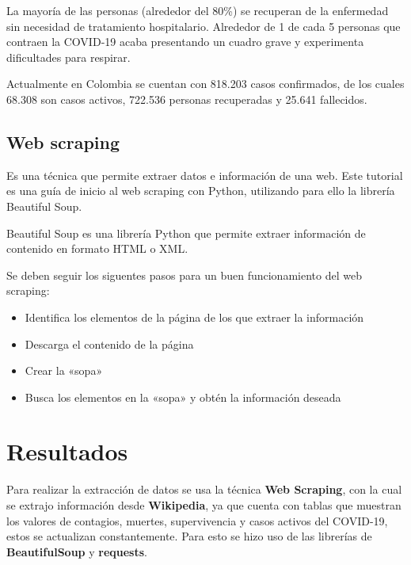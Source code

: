 \documentclass[conference,compsoc,onecolumn]{IEEEtran}
\begin{document}
La mayoría de las personas (alrededor del 80\%) se recuperan de la enfermedad sin necesidad de tratamiento hospitalario.  Alrededor de 1 de cada 5 personas que contraen la COVID‑19 acaba presentando un cuadro grave y experimenta dificultades para respirar.

Actualmente en Colombia se cuentan con 818.203 casos confirmados, de los cuales 68.308 son casos activos, 722.536 personas recuperadas y 25.641 fallecidos.
\hfill \break
\subsection{Web scraping} 
Es una técnica que permite extraer datos e información de una web. Este tutorial es una guía de inicio al web scraping con Python, utilizando para ello la librería Beautiful Soup.

Beautiful Soup es una librería Python que permite extraer información de contenido en formato HTML o XML.

Se deben seguir los siguentes pasos para un buen funcionamiento del web scraping:
\begin{itemize}
\item Identifica los elementos de la página de los que extraer la información
\item Descarga el contenido de la página
\item Crear la «sopa»
\item Busca los elementos en la «sopa» y obtén la información deseada
 \end{itemize}


\section{Resultados}
Para realizar la extracción de datos se usa la técnica \textbf{Web Scraping}, con la cual se extrajo información  desde \textbf{Wikipedia}, ya que cuenta con tablas que muestran los valores de contagios, muertes, supervivencia y casos activos del COVID-19, estos se actualizan constantemente.
Para esto se hizo uso de las librerías de \textbf{BeautifulSoup} y \textbf{requests}.
\hfill \break
\end{document}
